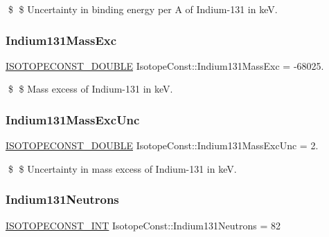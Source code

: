 \$ \$ Uncertainty in binding energy per A of Indium-\/131 in keV. \mbox{\label{group___isotope_const-_indium-_in131_ga5d6dfdd2ffacc1f60cddfd1ef940777c}} 
\subsubsection{\texorpdfstring{Indium131\+Mass\+Exc}{Indium131MassExc}}
{\footnotesize\ttfamily \mbox{\hyperlink{group___isotope_const-_macros_ga8f45a7272ce02c0b4c65c44636ed719a}{I\+S\+O\+T\+O\+P\+E\+C\+O\+N\+S\+T\+\_\+\+D\+O\+U\+B\+LE}} Isotope\+Const\+::\+Indium131\+Mass\+Exc = -\/68025.}

\$ \$ Mass excess of Indium-\/131 in keV. \mbox{\label{group___isotope_const-_indium-_in131_ga4c2b98b7137a4b9ff07d3a1d0dfb30a7}} 
\subsubsection{\texorpdfstring{Indium131\+Mass\+Exc\+Unc}{Indium131MassExcUnc}}
{\footnotesize\ttfamily \mbox{\hyperlink{group___isotope_const-_macros_ga8f45a7272ce02c0b4c65c44636ed719a}{I\+S\+O\+T\+O\+P\+E\+C\+O\+N\+S\+T\+\_\+\+D\+O\+U\+B\+LE}} Isotope\+Const\+::\+Indium131\+Mass\+Exc\+Unc = 2.}

\$ \$ Uncertainty in mass excess of Indium-\/131 in keV. \mbox{\label{group___isotope_const-_indium-_in131_ga2c5a13fe87f76c489cc000a4b09c2484}} 
\subsubsection{\texorpdfstring{Indium131\+Neutrons}{Indium131Neutrons}}
{\footnotesize\ttfamily \mbox{\hyperlink{group___isotope_const-_macros_ga5f18360b3e99483a35c32d789e62621c}{I\+S\+O\+T\+O\+P\+E\+C\+O\+N\+S\+T\+\_\+\+I\+NT}} Isotope\+Const\+::\+Indium131\+Neutrons = 82}

